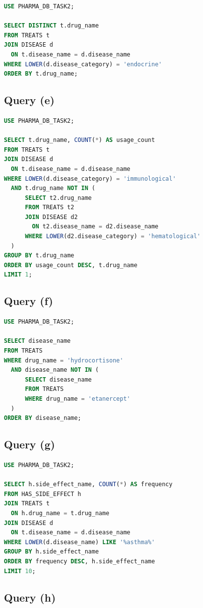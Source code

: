 \documentclass[15pt,a4paper]{article}
\begin{document}
\begin{lstlisting}[language=SQL]
USE PHARMA_DB_TASK2;

SELECT DISTINCT t.drug_name
FROM TREATS t
JOIN DISEASE d
  ON t.disease_name = d.disease_name
WHERE LOWER(d.disease_category) = 'endocrine'
ORDER BY t.drug_name;
\end{lstlisting}
\subsection{Query (e)}

\begin{lstlisting}[language=SQL]
USE PHARMA_DB_TASK2;

SELECT t.drug_name, COUNT(*) AS usage_count
FROM TREATS t
JOIN DISEASE d
  ON t.disease_name = d.disease_name
WHERE LOWER(d.disease_category) = 'immunological'
  AND t.drug_name NOT IN (
      SELECT t2.drug_name
      FROM TREATS t2
      JOIN DISEASE d2
        ON t2.disease_name = d2.disease_name
      WHERE LOWER(d2.disease_category) = 'hematological'
  )
GROUP BY t.drug_name
ORDER BY usage_count DESC, t.drug_name
LIMIT 1;
\end{lstlisting}
\subsection{Query (f)}

\begin{lstlisting}[language=SQL]
USE PHARMA_DB_TASK2;

SELECT disease_name
FROM TREATS
WHERE drug_name = 'hydrocortisone'
  AND disease_name NOT IN (
      SELECT disease_name
      FROM TREATS
      WHERE drug_name = 'etanercept'
  )
ORDER BY disease_name;
\end{lstlisting}
\subsection{Query (g)}

\begin{lstlisting}[language=SQL]
USE PHARMA_DB_TASK2;

SELECT h.side_effect_name, COUNT(*) AS frequency
FROM HAS_SIDE_EFFECT h
JOIN TREATS t
  ON h.drug_name = t.drug_name
JOIN DISEASE d
  ON t.disease_name = d.disease_name
WHERE LOWER(d.disease_name) LIKE '%asthma%'
GROUP BY h.side_effect_name
ORDER BY frequency DESC, h.side_effect_name
LIMIT 10;
\end{lstlisting}
\subsection{Query (h)}
\end{document}

